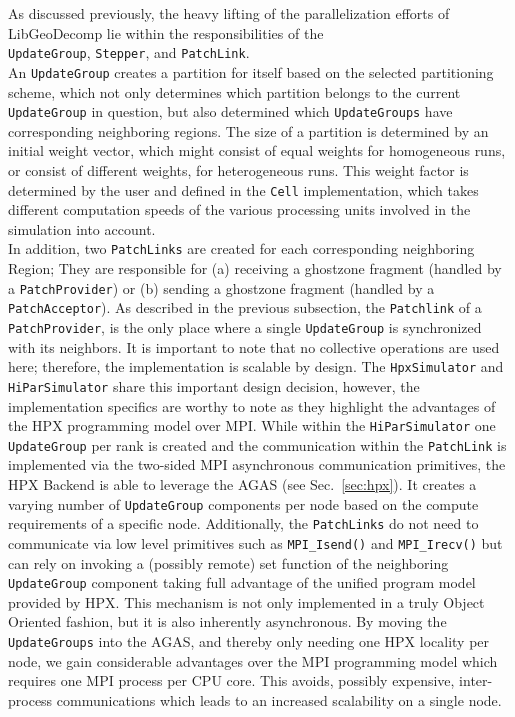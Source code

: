 \documentclass{sig-alternate}
\newcommand{\ctype}[1]{\texttt{{{#1}}}}
\newcommand{\cfunc}[1]{\texttt{{{#1}()}}}
\begin{document}
As discussed previously, the heavy lifting of the parallelization efforts of
LibGeoDecomp lie within the responsibilities of the \\ \ctype{UpdateGroup},
\ctype{Stepper}, and \ctype{PatchLink}. \\
An \ctype{UpdateGroup} creates a partition for itself based on the selected
partitioning scheme, which not only determines which partition belongs to the
current \ctype{UpdateGroup} in question, but also determined which \ctype{UpdateGroups} have
corresponding neighboring regions. The size of a partition is determined by an
initial weight vector, which might consist of equal weights for homogeneous runs,
or consist of different weights, for heterogeneous runs. This weight factor is
determined by the user and defined in the \ctype{Cell} implementation, which takes
different computation speeds of the various processing units involved in the
simulation into account. \\
In addition, two \ctype{PatchLinks} are created for each corresponding neighboring Region;
They are responsible for (a) receiving a ghostzone fragment (handled by a
\ctype{PatchProvider}) or (b) sending a ghostzone fragment (handled by a
\ctype{PatchAcceptor}). As described in the previous subsection, the \ctype{Patchlink}
of a \ctype{Patch\-Provider}, is the only place where a single \ctype{UpdateGroup}
is synchronized with its neighbors. It is important to note that no collective
operations are used here; therefore, the implementation is scalable by design. The
\ctype{HpxSimulator} and \ctype{HiParSimulator} share this important design
decision, however, the implementation specifics are worthy to note as they highlight
the advantages of the HPX programming model over MPI. While within the
\ctype{HiPar\-Simulator} one \ctype{UpdateGroup} per rank is created and the
communication within the \ctype{PatchLink} is implemented via the two-sided MPI asynchronous communication primitives, the HPX Backend is
able to leverage the AGAS (see Sec.~\ref{sec:hpx}).
It creates a varying number of \ctype{UpdateGroup}
components per node based on the compute requirements of a specific node.
Additionally, the \ctype{Patch\-Links} do not need to communicate via low level
primitives such as \cfunc{MPI\_Isend} and \cfunc{MPI\_Irecv} but can rely on
invoking a (possibly remote) set function of the neighboring \ctype{UpdateGroup}
component taking full advantage of the unified program model provided by HPX. This
mechanism is not only implemented in a truly Object Oriented fashion, but it is also inherently
asynchronous. By moving the \ctype{UpdateGroups} into the AGAS, and thereby only needing one HPX
locality per node, we gain considerable advantages over the MPI programming model which requires
one MPI process per CPU core. This avoids, possibly expensive, inter-process communications which leads to an
increased scalability on a single node.
\end{document}
